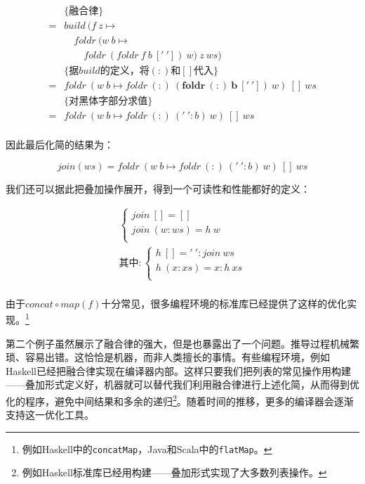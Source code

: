 \documentclass{article}
\begin{document}
\begin{example}
\[\begin{array}{rl}
  & \{\text{融合律}\} \\
= & build\ (f\ z \mapsto \\
  & \quad foldr\ (w\ b \mapsto \\
  & \quad \quad foldr\ (foldr\ f\ b\ ['\ '])\ w)\ z\ ws) \\

  & \{\text{据$build$的定义，将$(:)$和$[]$代入}\} \\
= & foldr\ (w\ b \mapsto foldr\ (:)\ \pmb{(foldr\ (:)\ b\ ['\ '])}\ w)\ []\ ws \\

  & \{\text{对黑体字部分求值}\} \\
= & foldr\ (w\ b \mapsto foldr\ (:)\ ('\ ' : b)\ w)\ []\ ws \\
\end{array} \]

因此最后化简的结果为：

\[
join(ws) = foldr\ (w\ b \mapsto foldr\ (:)\ ('\ ' : b)\ w)\ []\ ws
\]

我们还可以据此把叠加操作展开，得到一个可读性和性能都好的定义：

\[
\begin{array}{l}
\begin{cases}
join\ [] = [] \\
join\ (w:ws) = h\ w \\
\end{cases} \\
\text{其中}: \begin{cases}
             h\ [] = '\ ' : join\ ws \\
             h\ (x:xs) = x : h\ xs \\
             \end{cases} \\
\end{array}
\]

 
由于$concat \circ map(f)$十分常见，很多编程环境的标准库已经提供了这样的优化实现。\footnote{例如Haskell中的\texttt{concatMap}，Java和Scala中的\texttt{flatMap}。}
\end{example}

第二个例子虽然展示了融合律的强大，但是也暴露出了一个问题。推导过程机械繁琐、容易出错。这恰恰是机器，而非人类擅长的事情。有些编程环境，例如Haskell已经把融合律实现在编译器内部\cite{GLPJ-1993}。这样只要我们把列表的常见操作用构建——叠加形式定义好，机器就可以替代我们利用融合律进行上述化简，从而得到优化的程序，避免中间结果和多余的递归\footnote{例如Haskell标准库已经用构建——叠加形式实现了大多数列表操作。}。随着时间的推移，更多的编译器会逐渐支持这一优化工具。
\end{document}
